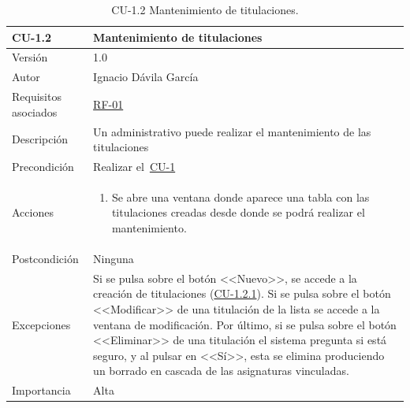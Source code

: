 \begin{table}[p]
	\centering
	\begin{tabularx}{\linewidth}{ p{} p{} }
		\toprule
		\textbf{CU-1.2}    & \textbf{Mantenimiento de titulaciones}\\
		\toprule
		{\small Versión}              & 1.0    \\
		{\small Autor}                & Ignacio Dávila García \\
		{\small Requisitos asociados} & \hyperref[itm:RF1]{RF-01} \\
		{\small Descripción}          & Un administrativo puede realizar el mantenimiento de las titulaciones \\
		{\small Precondición}         & Realizar el~\hyperref[table:CU-1]{CU-1} \\
		{\small Acciones}             &
		\begin{enumerate}
			\def\labelenumi{\arabic{enumi}.}
			\tightlist
			\item Se abre una ventana donde aparece una tabla con las titulaciones creadas desde donde se podrá realizar el mantenimiento.
		\end{enumerate}\\
		{\small Postcondición}        & Ninguna \\
		{\small Excepciones}          & Si se pulsa sobre el botón <<Nuevo>>, se accede a la creación de titulaciones (\hyperref[table:CU-1_2_1]{CU-1.2.1}). Si se pulsa sobre el botón <<Modificar>> de una titulación de la lista se accede a la ventana de modificación. Por último, si se pulsa sobre el botón <<Eliminar>> de una titulación el sistema pregunta si está seguro, y al pulsar en <<Sí>>, esta se elimina produciendo un borrado en cascada de las asignaturas vinculadas. \\
		{\small Importancia}          & Alta \\
		\bottomrule
	\end{tabularx}
	\caption{CU-1.2 Mantenimiento de titulaciones.}\label{table:CU-1_2}
\end{table}
\FloatBarrier

